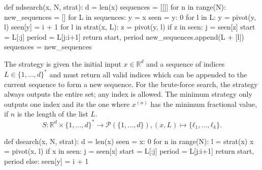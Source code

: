 \begin{Python}[
    float=tbp,
    numbers=left,
    caption={
      The implementation of the nondeterministic search.
      The search begins with the empty sequence and then queries the strategy
      for the next valid sequences.
      At the same time, it checks whether any vector has occurred twice
      and stops once it has found a duplicate.
    },
    label={lst:nondet-search},
  ]
def ndsearch(x, N, strat):
  d = len(x)
  sequences = [[]]
  for n in range(N):
    new_sequences = []
    for L in sequences:
      y = x
      seen = {y: 0}
      for l in L:
        y = pivot(y, l)
        seen[y] = i + 1
      for l in strat(x, L):
        z = pivot(y, l)
        if z in seen:
          j = seen[z]
          start = L[:j]
          period = L[j:i+1]
          return start, period
        new_sequences.append(L + [l])
    sequences = new_sequences
\end{Python}

The strategy is given the initial input $x ∈ ℝ^d$ and a sequence of indices $L
∈ \{1, …, d\}^*$ and must return all valid indices which can be appended to the
current sequence to form a new sequence.
For the brute-force search, the strategy always outputs the entire set; any index is allowed.
The minimum strategy only outputs one index and its the one where $x^{(n)}$ has
the minimum fractional value, if $n$ is the length of the list $L$.
\[
  S \colon ℝ^d × \{1, …, d\}^* → \mathcal P(\{1, …, d\}), (x, L) ↦ \{ℓ_1, …, ℓ_k\}.
\]

\begin{Python}[
    float=tbp,
    numbers=left,
    caption={
      The implementation of the deterministic search.
      The strategy \texttt{strat} only outputs a single index, which is used
      for pivoting.
      The search stops once a duplicate vector $x$ has been found and returns
      the preperiod and period once found.
    },
    label={lst:det-search},
  ]
def dsearch(x, N, strat):
  d = len(x)
  seen = {x: 0}
  for n in range(N):
    l = strat(x)
    x = pivot(x, l)
    if x in seen:
      j = seen[x]
      start = L[:j]
      period = L[j:i+1]
      return start, period
    else:
      seen[y] = i + 1
\end{Python}

